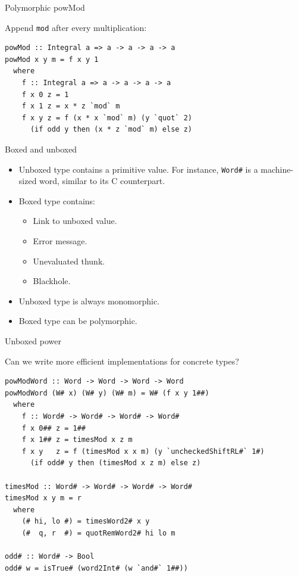 \documentclass[handout]{beamer}
\begin{document}
\begin{frame}[fragile]{Polymorphic powMod}

Append {\tt mod} after every multiplication:

\begin{lstlisting}
powMod :: Integral a => a -> a -> a -> a
powMod x y m = f x y 1
  where
    f :: Integral a => a -> a -> a -> a
    f x 0 z = 1
    f x 1 z = x * z `mod` m
    f x y z = f (x * x `mod` m) (y `quot` 2)
      (if odd y then (x * z `mod` m) else z)
\end{lstlisting}

\end{frame}

\begin{frame}{Boxed and unboxed}

\begin{itemize}

\item Unboxed type contains a primitive value. For instance, {\tt Word\#} is a machine-sized word, similar to its C counterpart.
\item Boxed type contains:
  \begin{itemize}
  \item Link to unboxed value.
  \item Error message.
  \item Unevaluated thunk.
  \item Blackhole.
  \end{itemize}
\item Unboxed type is always monomorphic.
\item Boxed type can be polymorphic.

\end{itemize}

\end{frame}

\begin{frame}[fragile]{Unboxed power}

Can we write more efficient implementations for concrete types?

\begin{lstlisting}
powModWord :: Word -> Word -> Word -> Word
powModWord (W# x) (W# y) (W# m) = W# (f x y 1##)
  where
    f :: Word# -> Word# -> Word# -> Word#
    f x 0## z = 1##
    f x 1## z = timesMod x z m
    f x y   z = f (timesMod x x m) (y `uncheckedShiftRL#` 1#)
      (if odd# y then (timesMod x z m) else z)

timesMod :: Word# -> Word# -> Word# -> Word#
timesMod x y m = r
  where
    (# hi, lo #) = timesWord2# x y
    (#  q, r  #) = quotRemWord2# hi lo m

odd# :: Word# -> Bool
odd# w = isTrue# (word2Int# (w `and#` 1##))
\end{lstlisting}

\end{frame}
\end{document}

